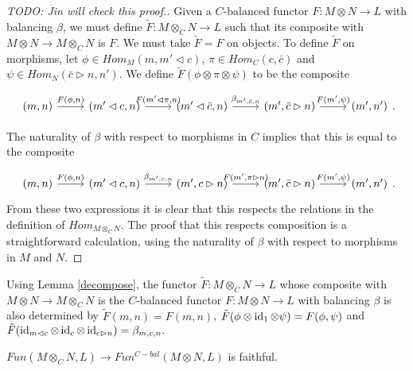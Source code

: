 \begin{proof}
  [TODO: Jin will check this proof.]

  Given a $C$-balanced functor $F:M\otimes N \to L$ with balancing $\beta$, we
  must define $\tilde{F}:M\otimes_C N \to L$ such that its composite with
  $M\otimes N\to M\otimes_C N$ is $F$. We must take $\tilde{F}=F$ on objects.
  To define $\tilde{F}$ on morphisms, let $\phi\in Hom_M(m,m'\lhd c)$, $\pi\in
  Hom_C(c,\bar{c})$ and $\psi\in Hom_N(\bar{c}\rhd n,n')$. We define
  $\tilde{F}(\phi\otimes\pi\otimes\psi)$ to be the composite

  \[
    \begin{tikzcd}
      {(m,n)} & {(m'\lhd c,n)} & {(m'\lhd \bar{c},n)} & {(m',\bar{c}\rhd n)} & {(m',n')}
      \arrow["{F(\phi,n)}", from=1-1, to=1-2]
      \arrow["{F(m'\lhd\pi,n)}", from=1-2, to=1-3]
      \arrow["{\beta_{m',\bar{c},n}}", from=1-3, to=1-4]
      \arrow["{F(m',\psi)}", from=1-4, to=1-5]
    \end{tikzcd}.
  \]

  The naturality of $\beta$ with respect to morphisms in $C$ implies that this
  is equal to the composite

  \[
    \begin{tikzcd}
      {(m,n)} & {(m'\lhd c,n)} & {(m', c\rhd n)} & {(m',\bar{c}\rhd n)} & {(m',n')}
      \arrow["{F(\phi,n)}", from=1-1, to=1-2]
      \arrow["{\beta_{m',c,n}}", from=1-2, to=1-3]
      \arrow["{F(m',\pi\rhd n)}", from=1-3, to=1-4]
      \arrow["{F(m',\psi)}", from=1-4, to=1-5]
    \end{tikzcd}.
  \]
  From these two expressions it is clear that this respects the relations in
  the definition of $Hom_{M\otimes_C N}$. The proof that this respects
  composition is a straightforward calculation, using the naturality of
  $\beta$ with respect to morphisms in $M$ and $N$.
  \end{proof}

  \begin{remark}
    Using Lemma \ref{decompose}, the functor $\tilde{F}:M\otimes_C N\to L$
    whose composite with $M\otimes N\to M\otimes_C N$ is the $C$-balanced
    functor $F:M\otimes N\to L$ with balancing $\beta$ is also determined by
    $\tilde{F}(m,n)=F(m,n)$,
    $\tilde{F}(\phi\otimes\operatorname{id}_1\otimes\psi)=F(\phi,\psi)$ and
    $\tilde{F}(\operatorname{id}_{m\lhd c}\otimes\operatorname{id}_c\otimes\operatorname{id}_{c\rhd n})=\beta_{m,c,n}.$
  \end{remark}

\begin{lemma}\label{faithful}
  $Fun(M\otimes_C N,L)\to Fun^{C-bal}(M\otimes N,L)$ is faithful.
\end{lemma}

